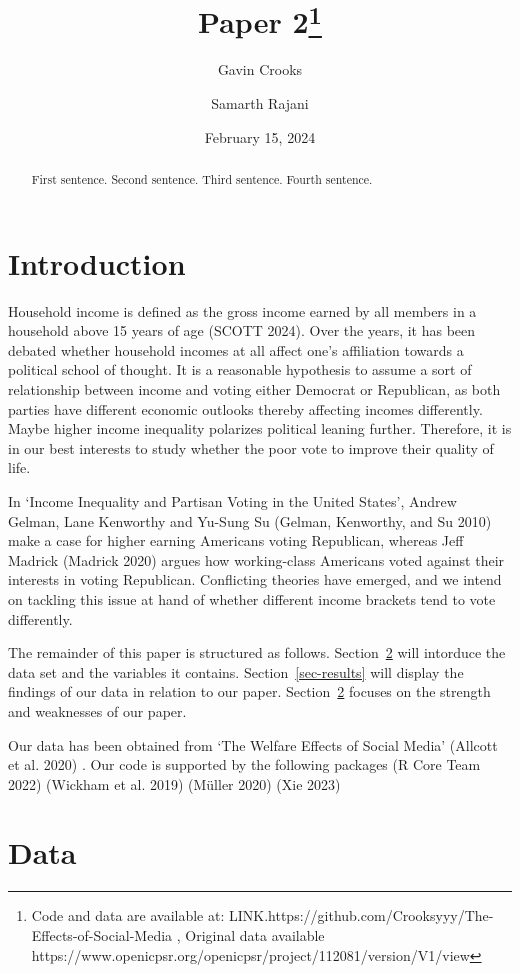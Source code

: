 \documentclass[
  letterpaper,
  DIV=11,
  numbers=noendperiod]{scrartcl}
\title{Paper 2\thanks{Code and data are available at:
LINK.https://github.com/Crooksyyy/The-Effects-of-Social-Media , Original
data available
https://www.openicpsr.org/openicpsr/project/112081/version/V1/view}}
\author{Gavin Crooks \and Samarth Rajani}
\date{February 15, 2024}
\renewcommand*\contentsname{Table of contents}
\newcommand\contentsname{Table of contents}
\begin{document}
\maketitle
\begin{abstract}
First sentence. Second sentence. Third sentence. Fourth sentence.
\end{abstract}

\renewcommand*\contentsname{Table of contents}
{
\hypersetup{linkcolor=}
\setcounter{tocdepth}{3}
\tableofcontents
}
\section{Introduction}\label{sec-intro}

Household income is defined as the gross income earned by all members in
a household above 15 years of age (SCOTT 2024). Over the years, it has
been debated whether household incomes at all affect one's affiliation
towards a political school of thought. It is a reasonable hypothesis to
assume a sort of relationship between income and voting either Democrat
or Republican, as both parties have different economic outlooks thereby
affecting incomes differently. Maybe higher income inequality polarizes
political leaning further. Therefore, it is in our best interests to
study whether the poor vote to improve their quality of life.

In `Income Inequality and Partisan Voting in the United States', Andrew
Gelman, Lane Kenworthy and Yu-Sung Su (Gelman, Kenworthy, and Su 2010)
make a case for higher earning Americans voting Republican, whereas Jeff
Madrick (Madrick 2020) argues how working-class Americans voted against
their interests in voting Republican. Conflicting theories have emerged,
and we intend on tackling this issue at hand of whether different income
brackets tend to vote differently.

The remainder of this paper is structured as follows.
Section~\ref{sec-data} will intorduce the data set and the variables it
contains. Section~\ref{sec-results} will display the findings of our
data in relation to our paper. Section~\ref{sec-data} focuses on the
strength and weaknesses of our paper.

Our data has been obtained from `The Welfare Effects of Social Media'
(Allcott et al. 2020) . Our code is supported by the following packages
(R Core Team 2022) (Wickham et al. 2019) (Müller 2020) (Xie 2023)

\section{Data}\label{sec-data}
\end{document}
